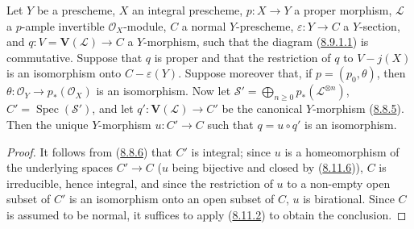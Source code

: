 \begin{proposition}[8.11.7]
\label{II.8.11.7}
Let $Y$ be a prescheme, $X$ an integral prescheme, $p:X\to Y$ a proper
morphism, $\mathcal{L}$ a $p$-ample invertible $\mathcal{O}_X$-module, $C$ a
normal $Y$-prescheme, $\varepsilon:Y\to C$ a $Y$-section, and
$q:V=\mathbf{V}(\mathcal{L})\to C$ a $Y$-morphism, such that the diagram
(\hyperref[II.8.9.1.1]{8.9.1.1}) is commutative. Suppose that $q$ is
proper and that the restriction of $q$ to $V-j(X)$ is an isomorphism onto
$C-\varepsilon(Y)$. Suppose moreover that,
if $p=(p_0,\theta)$, then $\theta:\mathcal{O}_Y\to p_*(\mathcal{O}_X)$ is an
isomorphism. Now let
$\mathcal{S}'=\bigoplus_{n\geqslant0}p_*(\mathcal{L}^{\otimes n})$,
$C'=\operatorname{Spec}(\mathcal{S}')$, and let
$q':\mathbf{V}(\mathcal{L})\to C'$ be the canonical $Y$-morphism
(\hyperref[II.8.8.5]{8.8.5}). Then the unique $Y$-morphism $u:C'\to C$ such
that $q=u\circ q'$ is an isomorphism.
\end{proposition}

\begin{proof}
It follows from (\hyperref[II.8.8.6]{8.8.6}) that $C'$ is integral; since
$u$ is a homeomorphism of the underlying spaces $C'\to C$ ($u$ being
bijective and closed by (\hyperref[II.8.11.6]{8.11.6})), $C$ is
irreducible, hence integral, and since the restriction of $u$ to a non-empty
open subset of $C'$ is an isomorphism onto an open subset of $C$, $u$ is
birational. Since $C$ is assumed to be normal, it suffices to apply
(\hyperref[II.8.11.2]{8.11.2}) to obtain the conclusion.
\end{proof}

